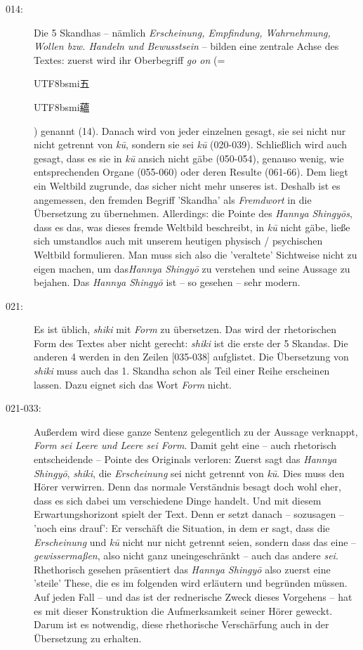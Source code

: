 \documentclass[
DIV=calc,
BCOR=5mm,
11pt,
headings=small,
oneside,
bibtotocnumbered]{scrartcl}
\newcommand{\cnbsmi}[1]{\begin{CJK}{UTF8}{bsmi}#1\end{CJK}}
\begin{document}
\begin{description}
  \item[014:] Die 5 Skandhas -- nämlich \emph{Erscheinung, Empfindung,
  Wahrnehmung, Wollen bzw. Handeln und Bewusstsein} -- bilden eine zentrale
  Achse des Textes: zuerst wird ihr Oberbegriff \emph{go on} (= \cnbsmi{五}
  \cnbsmi{蘊}) genannt (14). Danach wird von jeder einzelnen gesagt, sie sei
  nicht nur nicht getrennt von \emph{kū}, sondern sie sei \emph{kū} (020-039).
  Schließlich wird auch gesagt, dass es sie in \emph{kū} ansich nicht gäbe
  (050-054), genauso wenig, wie entsprechenden Organe (055-060) oder deren
  Resulte (061-66). Dem liegt ein Weltbild zugrunde, das sicher nicht mehr
  unseres ist. Deshalb ist es angemessen, den fremden Begriff 'Skandha' als
  \emph{Fremdwort} in die Übersetzung zu übernehmen. Allerdings: die Pointe des
  \emph{Hannya Shingyōs}, dass es das, was dieses fremde Weltbild beschreibt, in
  \emph{kū} nicht gäbe, ließe sich umstandlos auch mit unserem heutigen physisch
  / psychischen Weltbild formulieren. Man muss sich also die 'veraltete'
  Sichtweise nicht zu eigen machen, um das\emph{Hannya Shingyō} zu verstehen und
  seine Aussage zu bejahen. Das \emph{Hannya Shingyō} ist -- so gesehen -- sehr
  modern.
  
  \item[021:] Es ist üblich, \emph{shiki} mit \emph{Form} zu übersetzen. Das
  wird der rhetorischen Form des Textes aber nicht gerecht: \emph{shiki} ist die
  erste der 5 Skandas. Die anderen 4 werden in den Zeilen [035-038] aufglistet.
  Die Übersetzung von \emph{shiki} muss auch das 1. Skandha schon als Teil einer
  Reihe erscheinen lassen. Dazu eignet sich das Wort \emph{Form} nicht.

  \item[021-033:] Außerdem wird diese ganze Sentenz gelegentlich zu der Aussage
  verknappt, \emph{Form sei Leere und Leere sei Form}. Damit geht eine -- auch
  rhetorisch entscheidende -- Pointe des Originals verloren: Zuerst sagt das
  \emph{Hannya Shingyō}, \emph{shiki}, die \emph{Erscheinung} sei nicht getrennt
  von \emph{kū}. Dies muss den Hörer verwirren. Denn das normale Verständnis
  besagt doch wohl eher, dass es sich dabei um verschiedene Dinge handelt. Und
  mit diesem Erwartungshorizont spielt der Text. Denn er setzt danach --
  sozusagen -- 'noch eins drauf': Er verschäft die Situation, in dem er sagt,
  dass die \emph{Erscheinung} und \emph{kū} nicht nur nicht getrennt seien,
  sondern dass das eine -- \emph{gewissermaßen}, also nicht ganz uneingeschränkt
  -- auch das andere \emph{sei}. Rhethorisch gesehen präsentiert das
  \emph{Hannya Shingyō} also zuerst eine 'steile' These, die es im folgenden
  wird erläutern und begründen müssen. Auf jeden Fall -- und das ist der
  rednerische Zweck dieses Vorgehens -- hat es mit dieser Konstruktion die
  Aufmerksamkeit seiner Hörer geweckt. Darum ist es notwendig, diese
  rhethorische Verschärfung auch in der Übersetzung zu erhalten.
  

\end{description}
\end{document}
